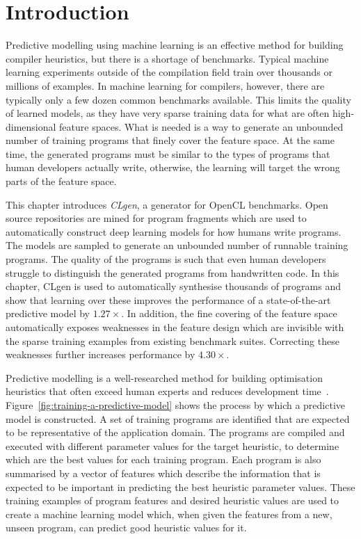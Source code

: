 \section{Introduction}

Predictive modelling using machine learning is an effective method for building compiler heuristics, but there is a shortage of benchmarks. Typical machine learning experiments outside of the compilation field train over thousands or millions of examples. In machine learning for compilers, however, there are typically only a few dozen common benchmarks available. This limits the quality of learned models, as they have very sparse training data for what are often high-dimensional feature spaces. What is needed is a way to generate an unbounded number of training programs that finely cover the feature space. At the same time, the generated programs must be similar to the types of programs that human developers actually write, otherwise, the learning will target the wrong parts of the feature space.

This chapter introduces \emph{CLgen}, a generator for OpenCL benchmarks. Open source repositories are mined for program fragments which are used to automatically construct deep learning models for how humans write programs. The models are sampled to generate an unbounded number of runnable training programs. The quality of the programs is such that even human developers struggle to distinguish the generated programs from handwritten code. In this chapter, CLgen is used to automatically synthesise thousands of programs and show that learning over these improves the performance of a state-of-the-art predictive model by $1.27\times$. In addition, the fine covering of the feature space automatically exposes weaknesses in the feature design which are invisible with the sparse training examples from existing benchmark suites. Correcting these weaknesses further increases performance by $4.30\times$.

Predictive modelling is a well-researched method for building optimisation heuristics that often exceed human experts and reduces development time~\cite{Micolet2016,Wang2014c,Magni2014,Cummins2016,Wang2009,Wen2015,Wang2010,Falch2015,Collins2012,Leather2014,Ogilvie2014a}. Figure~\ref{fig:training-a-predictive-model} shows the process by which a predictive model is constructed. A set of training programs are identified that are expected to be representative of the application domain. The programs are compiled and executed with different parameter values for the target heuristic, to determine which are the best values for each training program. Each program is also summarised by a vector of features which describe the information that is expected to be important in predicting the best heuristic parameter values. These training examples of program features and desired heuristic values are used to create a machine learning model which, when given the features from a new, unseen program, can predict good heuristic values for it.

